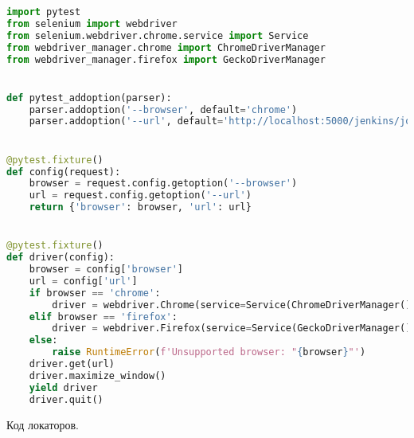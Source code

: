 \begin{lstlisting}[language=Python]
import pytest
from selenium import webdriver
from selenium.webdriver.chrome.service import Service
from webdriver_manager.chrome import ChromeDriverManager
from webdriver_manager.firefox import GeckoDriverManager


def pytest_addoption(parser):
    parser.addoption('--browser', default='chrome')
    parser.addoption('--url', default='http://localhost:5000/jenkins/job/tets1/buildConfigurationStatistics/')


@pytest.fixture()
def config(request):
    browser = request.config.getoption('--browser')
    url = request.config.getoption('--url')
    return {'browser': browser, 'url': url}


@pytest.fixture()
def driver(config):
    browser = config['browser']
    url = config['url']
    if browser == 'chrome':
        driver = webdriver.Chrome(service=Service(ChromeDriverManager().install()))
    elif browser == 'firefox':
        driver = webdriver.Firefox(service=Service(GeckoDriverManager().install()))
    else:
        raise RuntimeError(f'Unsupported browser: "{browser}"')
    driver.get(url)
    driver.maximize_window()
    yield driver
    driver.quit()

\end{lstlisting}

Код локаторов.

